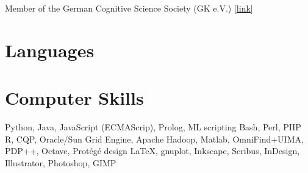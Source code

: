 \documentclass[11pt,a4paper]{moderncv}
\begin{document}
        {Member of the German Cognitive Science Society (GK e.V.)}
        {}
        {}
        {[\href{http://www.gk-ev.de}{link}]}
        {}
\closesection{}


\section{Languages}
\closesection{}


\section{Computer Skills}
        {Python, Java, JavaScript (ECMA\-Scrip), Prolog, ML}
    {scripting}
        {Bash, Perl, PHP}
        {R, CQP, Oracle/Sun Grid Engine, Apache Hadoop, Matlab, OmniFind+UIMA,
        PDP++, Octave, Prot\'{e}g\'{e}}
    {design}
        {\LaTeX, gnuplot, Inkscape, Scribus, InDesign, Illustrator, Photoshop, GIMP}%
\closesection{}

\end{document}
